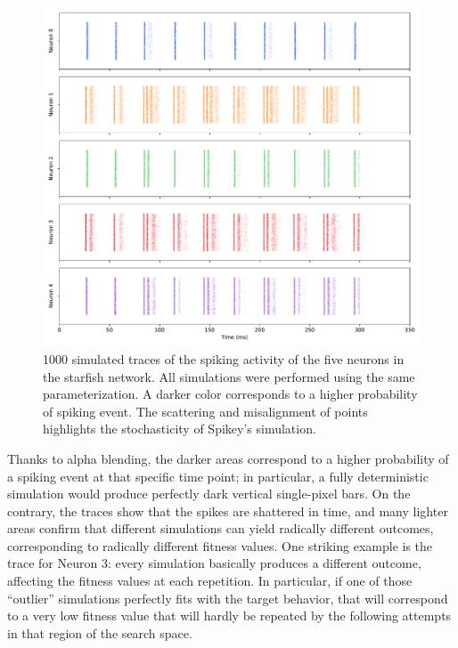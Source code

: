 \documentclass[utf8]{frontiersFPHY} %
\begin{document}
\begin{figure}[!ht]
    \centering
    \includegraphics[width=\textwidth]{images/failed-starfish/distribution-firing-light.pdf}
    \caption{1000 simulated traces of the spiking activity of the five neurons in the starfish network. All simulations were performed using the same parameterization. A darker color corresponds to a higher probability of spiking event. The scattering and misalignment of points highlights the stochasticity of Spikey's simulation.}
    \label{fig:distributionfiring}
\end{figure}

Thanks to alpha blending, the darker areas correspond to a higher probability of a spiking event at that specific time point; in particular, a fully deterministic simulation would produce perfectly dark vertical single-pixel bars.
On the contrary, the traces show that the spikes are shattered in time, and many lighter areas confirm that different simulations can yield radically different outcomes, corresponding to radically different fitness values.
One striking example is the trace for Neuron 3: every simulation basically produces a different outcome, affecting the fitness values at each repetition. 
In particular, if one of those ``outlier'' simulations perfectly fits with the target behavior, that will correspond to a very low fitness value that will hardly be repeated by the following attempts in that region of the search space. 
\end{document}
